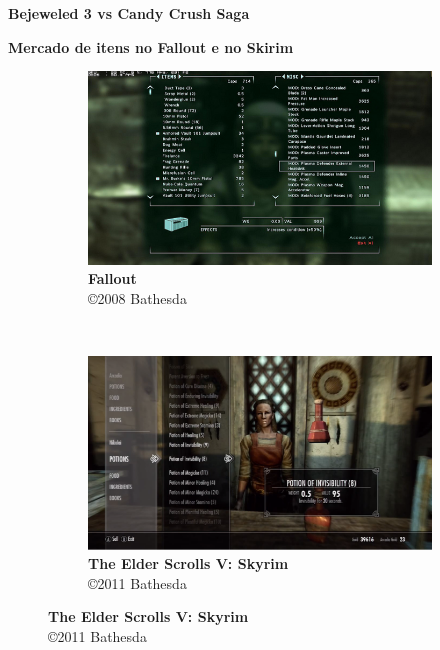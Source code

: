 \expandafter\documentclass\expandafter[table, usenames, svgnames, dvipsnames, \classopts]{beamer}
\begin{document}
\begin{frame}{\textbf{Bejeweled 3 vs Candy Crush Saga}}

\end{frame}

\begin{frame}{\textbf{Mercado de itens no Fallout e no Skirim}}

	\begin{figure}
	    \centering

	    \begin{subfigure}[!h]{0.4\paperwidth}
	    	\centering
	    	\includegraphics[height=0.32\paperheight]{fallout-screenshot}
	        \caption{\scriptsize\textbf{Fallout}\\\copyright{2008} Bathesda\footnotemark{}}
	    \end{subfigure}
	    ~
		\begin{subfigure}[!h]{0.4\paperwidth}
			\centering
	        \includegraphics[height=0.32\paperheight]{skyrim-screenshot}
	        \caption{\scriptsize\textbf{The Elder Scrolls V: Skyrim}\\\copyright{2011} Bathesda\footnotemark{}}
	    \end{subfigure}
    \end{figure}


\end{frame}
\end{document}
